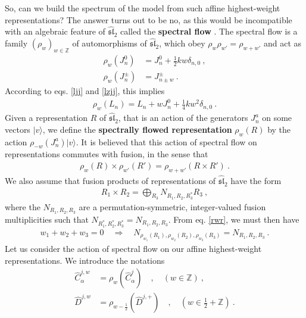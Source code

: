 \documentclass[12pt,a4paper,notitlepage]{report}
\numberwithin{equation}{section}
\theoremstyle{break}
\begin{document}
So, can we build the spectrum of the model from such affine highest-weight representations?
The answer turns out to be no, as this would be incompatible with an algebraic feature of $\widehat{\mathfrak{sl}}_2$ called the \textbf{\boldmath spectral flow} \cite{mo00a}.
The spectral flow is a family $(\rho_w)_{w\in{\mathbb{Z}}}$ of automorphisms of $\widehat{\mathfrak{sl}}_2$, which obey $\rho_w\rho_{w'}=\rho_{w+w'}$ and act as 
\begin{align}
 \rho_w(J^0_n)&=  J^0_n + \frac12 kw \delta_{n,0}   \ ,
\\
 \rho_w(J^\pm_n) &= J^\pm_{n\pm w}  \ .
\end{align}
According to eqs. \eqref{ljj} and \eqref{lzjj}, this implies
\begin{align}
 \rho_w(L_n)  = L_n + wJ^0_n +\frac14 kw^2 \delta_{n,0}\ .
\end{align}
Given a representation $R$ of $\widehat{\mathfrak{sl}}_2$, that is an action of the generators $J^a_n$ on some vectors $|v\rangle$, we define the \textbf{\boldmath spectrally flowed representation} $\rho_w(R)$ by the action $\rho_{-w}(J^a_n)|v\rangle$.  
It is believed that this action of spectral flow on representations commutes with fusion, in the sense that \cite{gab01b}
\begin{align}
 \rho_{w}(R)\times \rho_{w'}(R') = \rho_{w+w'}(R\times R')\ .
\label{rwr}
\end{align}
We also assume that fusion products of representations of $\widehat{\mathfrak{sl}}_2$ have the form 
\begin{align}
 R_1\times R_2 = \bigoplus_{R_3} N_{R_1,R_2,R_3^*} R_3\ ,
\end{align}
where the $N_{R_1,R_2,R_3}$ are a permutation-symmetric, integer-valued fusion multiplicities such that $N_{R_1^*,R_2^*,R_3^*}=N_{R_1,R_2,R_3}$.
From eq. \eqref{rwr}, we must then have 
\begin{align}
w_1+w_2+w_3=0 \quad \Rightarrow \quad N_{\rho_{w_1}(R_1),\rho_{w_2}(R_2),\rho_{w_3}(R_3)}=N_{R_1,R_2,R_3}\ .
\label{nrrr} 
\end{align}
Let us consider the action of spectral flow on our affine highest-weight representations. 
We introduce the notations 
\begin{align}
 \hat{C}^{j,w}_\alpha &= \rho_w(\hat{C}^j_\alpha) \quad , \quad (w\in{\mathbb{Z}})\ ,
\\
\hat{D}^{j,w} &= \rho_{w-\frac12}(\hat{D}^{j,+})\quad , \quad (w\in \tfrac12+{\mathbb{Z}})\ .
\end{align}
\end{document}
